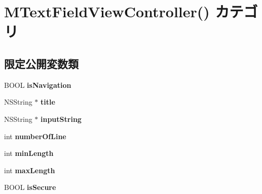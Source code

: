 \hypertarget{category_m_text_field_view_controller_07_08}{}\section{M\+Text\+Field\+View\+Controller() カテゴリ}
\label{category_m_text_field_view_controller_07_08}
\subsection*{限定公開変数類}
\begin{DoxyCompactItemize}
\item 
\hypertarget{category_m_text_field_view_controller_07_08_a0326554130522d32dee74eab002f0785}{}B\+O\+O\+L {\bfseries is\+Navigation}\label{category_m_text_field_view_controller_07_08_a0326554130522d32dee74eab002f0785}

\item 
\hypertarget{category_m_text_field_view_controller_07_08_a76cca1b2be5681430dab6a6732652914}{}N\+S\+String $\ast$ {\bfseries title}\label{category_m_text_field_view_controller_07_08_a76cca1b2be5681430dab6a6732652914}

\item 
\hypertarget{category_m_text_field_view_controller_07_08_a33d0087d275af1a326ae22307582bb9e}{}N\+S\+String $\ast$ {\bfseries input\+String}\label{category_m_text_field_view_controller_07_08_a33d0087d275af1a326ae22307582bb9e}

\item 
\hypertarget{category_m_text_field_view_controller_07_08_a0265c953ca787002b1dbe019a41c9b25}{}int {\bfseries number\+Of\+Line}\label{category_m_text_field_view_controller_07_08_a0265c953ca787002b1dbe019a41c9b25}

\item 
\hypertarget{category_m_text_field_view_controller_07_08_a85a97af7db63e41bdd0faea0adf54910}{}int {\bfseries min\+Length}\label{category_m_text_field_view_controller_07_08_a85a97af7db63e41bdd0faea0adf54910}

\item 
\hypertarget{category_m_text_field_view_controller_07_08_a1adcf04c87dcea88c8935ac9d5044087}{}int {\bfseries max\+Length}\label{category_m_text_field_view_controller_07_08_a1adcf04c87dcea88c8935ac9d5044087}

\item 
\hypertarget{category_m_text_field_view_controller_07_08_ac1f6efefc399d5ba0af9ac3ab8d9c25e}{}B\+O\+O\+L {\bfseries is\+Secure}\label{category_m_text_field_view_controller_07_08_ac1f6efefc399d5ba0af9ac3ab8d9c25e}


\end{DoxyCompactItemize}
